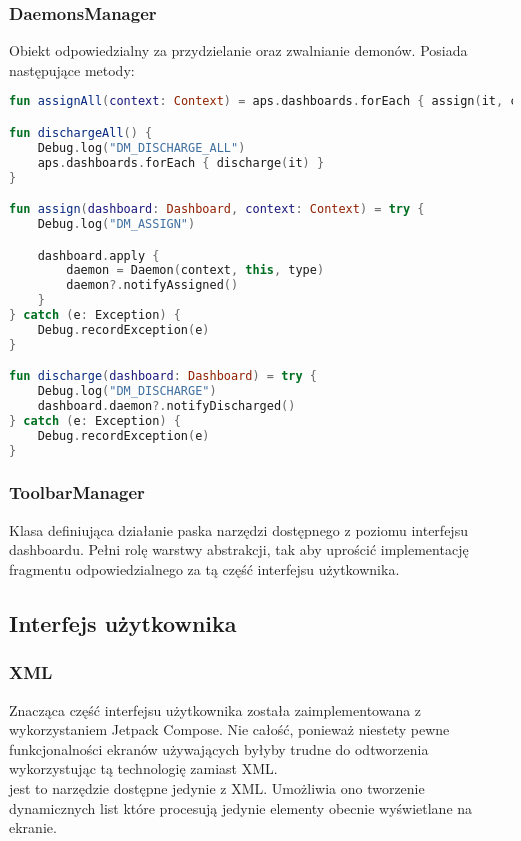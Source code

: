 \newpage

\subsubsection{DaemonsManager}
Obiekt odpowiedzialny za przydzielanie oraz zwalnianie demonów. Posiada następujące metody:
\begin{lstlisting}[language=Kotlin]
fun assignAll(context: Context) = aps.dashboards.forEach { assign(it, context) }

fun dischargeAll() {
    Debug.log("DM_DISCHARGE_ALL")
    aps.dashboards.forEach { discharge(it) }
}

fun assign(dashboard: Dashboard, context: Context) = try {
    Debug.log("DM_ASSIGN")

    dashboard.apply {
        daemon = Daemon(context, this, type)
        daemon?.notifyAssigned()
    }
} catch (e: Exception) {
    Debug.recordException(e)
}

fun discharge(dashboard: Dashboard) = try {
    Debug.log("DM_DISCHARGE")
    dashboard.daemon?.notifyDischarged()
} catch (e: Exception) {
    Debug.recordException(e)
}
\end{lstlisting}

\subsubsection{ToolbarManager}
Klasa definiująca działanie paska narzędzi dostępnego z poziomu interfejsu dashboardu. Pełni rolę warstwy abstrakcji, tak aby uprościć implementację fragmentu odpowiedzialnego za tą część interfejsu użytkownika.

\newpage

\subsection{Interfejs użytkownika}
\subsubsection{XML}
Znacząca część interfejsu użytkownika została zaimplementowana z wykorzystaniem Jetpack Compose. Nie całość, ponieważ niestety pewne funkcjonalności ekranów używających  byłyby trudne do odtworzenia wykorzystując tą technologię zamiast XML.\\

 jest to narzędzie dostępne jedynie z XML. Umożliwia ono tworzenie dynamicznych list które procesują jedynie elementy obecnie wyświetlane na ekranie.\\

